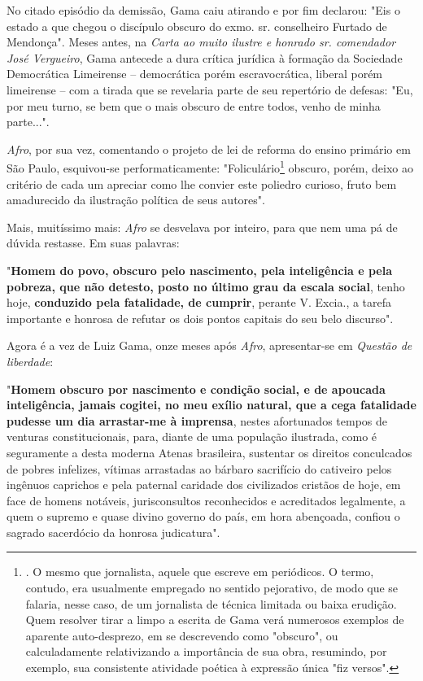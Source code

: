 No citado episódio da demissão, Gama caiu atirando e por fim declarou:
"Eis o estado a que chegou o discípulo obscuro do exmo. sr. conselheiro
Furtado de Mendonça". Meses antes, na \emph{Carta ao muito ilustre e
honrado sr. comendador José Vergueiro}, Gama antecede a dura crítica
jurídica à formação da Sociedade Democrática Limeirense -- democrática
porém escravocrática, liberal porém limeirense -- com a tirada que se
revelaria parte de seu repertório de defesas: "Eu, por meu turno, se bem
que o mais obscuro de entre todos, venho de minha parte...".

\emph{Afro}, por sua vez, comentando o projeto de lei de reforma do
ensino primário em São Paulo, esquivou-se performaticamente:
"Foliculário\footnote{. O mesmo que jornalista, aquele que escreve em
  periódicos. O termo, contudo, era usualmente empregado no sentido
  pejorativo, de modo que se falaria, nesse caso, de um jornalista de
  técnica limitada ou baixa erudição. Quem resolver tirar a limpo a
  escrita de Gama verá numerosos exemplos de aparente auto-desprezo, em
  se descrevendo como "obscuro", ou calculadamente relativizando a
  importância de sua obra, resumindo, por exemplo, sua consistente
  atividade poética à expressão única "fiz versos".} obscuro, porém,
deixo ao critério de cada um apreciar como lhe convier este poliedro
curioso, fruto bem amadurecido da ilustração política de seus autores".

Mais, muitíssimo mais: \emph{Afro} se desvelava por inteiro, para que
nem uma pá de dúvida restasse. Em suas palavras:

"\textbf{Homem do povo, obscuro pelo nascimento, pela inteligência e
pela pobreza, que não detesto, posto no último grau da escala social},
tenho hoje, \textbf{conduzido pela fatalidade, de cumprir}, perante V.
Excia., a tarefa importante e honrosa de refutar os dois pontos capitais
do seu belo discurso".

Agora é a vez de Luiz Gama, onze meses após \emph{Afro}, apresentar-se
em \emph{Questão de liberdade}:

"\textbf{Homem obscuro por nascimento e condição social, e de apoucada
inteligência, jamais cogitei, no meu exílio natural, que a cega
fatalidade pudesse um dia arrastar-me à imprensa}, nestes afortunados
tempos de venturas constitucionais, para, diante de uma população
ilustrada, como é seguramente a desta moderna Atenas brasileira,
sustentar os direitos conculcados de pobres infelizes, vítimas
arrastadas ao bárbaro sacrifício do cativeiro pelos ingênuos caprichos e
pela paternal caridade dos civilizados cristãos de hoje, em face de
homens notáveis, jurisconsultos reconhecidos e acreditados legalmente, a
quem o supremo e quase divino governo do país, em hora abençoada,
confiou o sagrado sacerdócio da honrosa judicatura".

